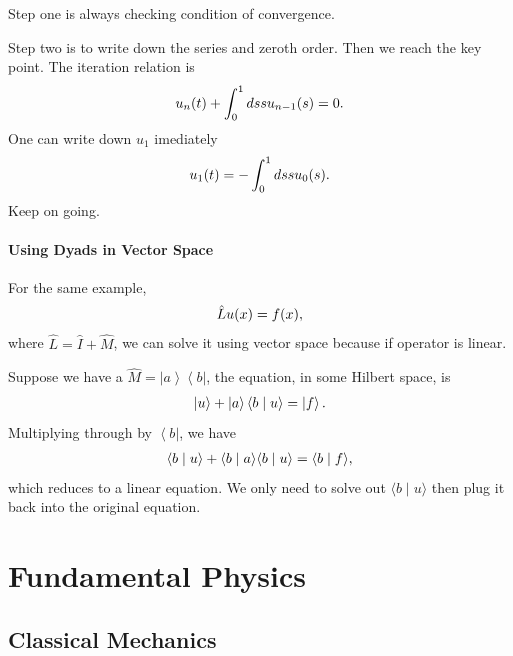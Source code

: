 \documentclass[letterpaper,10pt,english]{sphinxmanual}
\newcommand{\bra}[1]{\left\langle #1\right|}
\newcommand{\ket}[1]{\left| #1\right\rangle}
\newcommand{\braket}[2]{\langle #1 \mid #2 \rangle}
\begin{document}
Step one is always checking condition of convergence.

Step two is to write down the series and zeroth order. Then we reach the key point. The iteration relation is
\begin{gather}
\begin{split}u_n(t) + \int_0^1 ds su_{n-1}(s) = 0.\end{split}\notag
\end{gather}
One can write down \(u_1\) imediately
\begin{gather}
\begin{split}u_1(t) = -\int_0^1 ds s u_0(s).\end{split}\notag
\end{gather}
Keep on going.


\subsubsection{Using Dyads in Vector Space}
\label{equation-solving:using-dyads-in-vector-space}
For the same example,
\begin{gather}
\begin{split}\hat L u(x) = f(x),\end{split}\notag
\end{gather}
where \(\hat L=\hat I + \hat M\), we can solve it using vector space because if operator is linear.

Suppose we have a \(\hat M=\ket{a}\bra{b}\), the equation, in some Hilbert space, is
\begin{gather}
\begin{split}\ket{u} + \ket{a}\braket{b}{u} = \ket{f}.\end{split}\notag
\end{gather}
Multiplying through by \(\bra{b}\), we have
\begin{gather}
\begin{split}\braket{b}{u} + \braket{b}{a}\braket{b}{u} = \braket{b}{f},\end{split}\notag
\end{gather}
which reduces to a linear equation. We only need to solve out \(\braket{b}{u}\) then plug it back into the original equation.


\chapter{Fundamental Physics}
\label{index:fundamental-physics}

\section{Classical Mechanics}
\label{ClassicalMechanics:classical-mechanics}\label{ClassicalMechanics::doc}
\end{document}
